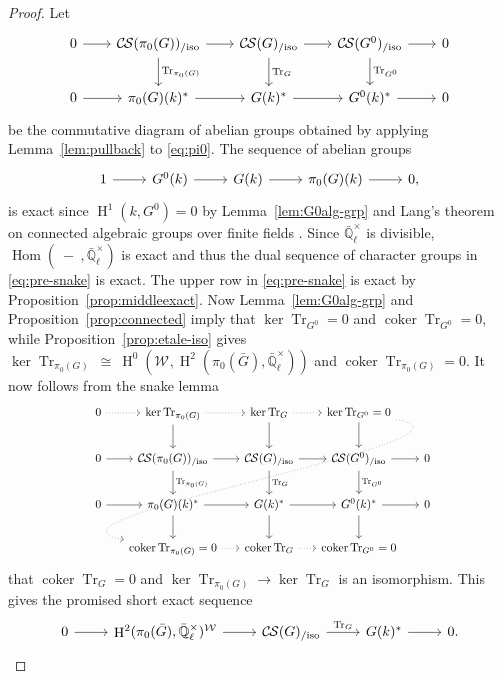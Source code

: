\documentclass[10pt]{amsart}
\theoremstyle{plain}
\theoremstyle{definition}
\newcommand{\EE}{\mathbb{\bar Q}_\ell}
\newcommand{\Fq}{k}
\newcommand{\EEx}{\EE^\times}
\newcommand{\Weil}[1]{\mathcal{W}_{#1}}
\DeclareMathOperator{\Hom}{Hom}
\DeclareMathOperator{\coker}{coker}
\DeclareMathOperator{\Hh}{H}
\newcommand{\iso}{{\ \cong\ }}
\newcommand{\TrFrob}[1]{\operatorname{Tr}_{#1}}
\newcommand{\CS}{{\mathcal{C\hskip-0.8pt S}}}
\newcommand{\CSiso}[1]{\CS(#1)_{/\text{iso}}}
\newcommand{\bG}{\bar{G}}
\begin{document}
\begin{proof}
  Let
  \begin{equation}\label{eq:pre-snake}
  \begin{tikzcd}[row sep=20, column sep=20]
    0 \rar & \CSiso{\pi_0(G)} \rar \dar{\TrFrob{\pi_0(G)}}
    & \CSiso{G} \rar \dar{\TrFrob{G}} & \CSiso{G^0} \rar \dar{\TrFrob{G^0}} & 0\\
    0 \rar & \pi_0(G)(\Fq)^* \rar
    &  G(\Fq)^* \rar & G^0(\Fq)^* \rar & 0
  \end{tikzcd}
  \end{equation}
  be the commutative diagram of abelian groups obtained by applying
  Lemma~\ref{lem:pullback} to \eqref{eq:pi0}.
  The sequence of abelian groups
\[
  \begin{tikzcd}
    1 \rar & G^0(\Fq) \rar & G(\Fq) \rar & \pi_0(G)(\Fq) \rar & 0,
  \end{tikzcd}
\]
  is exact since $\Hh^1(\Fq,G^0) =0$ by Lemma~\ref{lem:G0alg-grp} and Lang's theorem on connected algebraic groups over finite fields \cite{lang:56a}.
  Since $\EEx$ is divisible, $\Hom(\ - \ ,\EEx)$ is exact and thus the dual sequence of
  character groups in \eqref{eq:pre-snake} is exact.
%
  The upper row in \eqref{eq:pre-snake} is exact by Proposition~\ref{prop:middleexact}.
  Now Lemma~\ref{lem:G0alg-grp} and Proposition~\ref{prop:connected}
  imply that $\ker \TrFrob{G^0} =0$ and $\coker \TrFrob{G^0}=0$,
  while Proposition~\ref{prop:etale-iso} gives $\ker \TrFrob{\pi_0(G)} \iso \Hh^0(\Weil{},\Hh^2(\pi_0(\bG),\EEx))$
  and $\coker \TrFrob{\pi_0(G)}=0$.
It now follows from the snake lemma
 \begin{equation}\label{eq:snake}
  \begin{tikzcd}[row sep=20, column sep=15]
    0 \arrow[dotted]{r} & \ker \TrFrob{\pi_0(G)} \arrow[dotted]{r} \dar & \arrow{d} \ker \TrFrob{G} \arrow[dotted]{r}
    & \ker \TrFrob{G^0} =0 \arrow[dotted, out=-10, in=170]{dddll} \dar & \\
    0 \rar & \CSiso{\pi_0(G)} \rar \dar{\TrFrob{\pi_0(G)}}
    & \CSiso{G} \rar \dar{\TrFrob{G}} & \CSiso{G^0} \rar \dar{\TrFrob{G^0}} & 0\\
    0 \rar & \pi_0(G)(\Fq)^* \rar \dar
    & \arrow{d} G(\Fq)^* \rar & G^0(\Fq)^* \rar \dar & 0\\
   &  \coker \TrFrob{\pi_0(G)} =0 \arrow[dotted]{r} & \coker \TrFrob{G} \arrow[dotted]{r} & \coker \TrFrob{G^0} =0 & 
  \end{tikzcd}
  \end{equation}
that $\coker \TrFrob{G} =0$
and $\ker \TrFrob{\pi_0(G)} \to \ker \TrFrob{G}$ is an isomorphism.
This gives the promised short exact sequence
\[
  \begin{tikzcd}
0 \arrow{r} & \Hh^2(\pi_0(\bG),\EEx)^{\Weil{}} \arrow{r} & \CSiso{G} \arrow{r}{\TrFrob{G}} & G(\Fq)^* \arrow{r} & 0. 
  \end{tikzcd}
\]
\end{proof}
\end{document}
